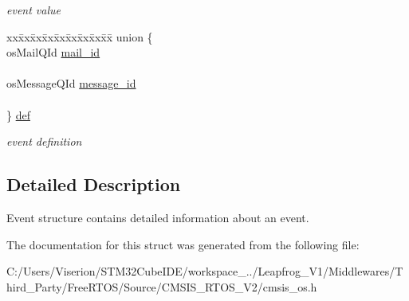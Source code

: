 \begin{DoxyCompactItemize}
\begin{tabbing}
\end{tabbing}\begin{DoxyCompactList}\small\item\em event value \end{DoxyCompactList}\item 
\mbox{\label{structos_event_a90f9650ceb8eb3a9481270a99caaa47f}} 
\begin{tabbing}
xx\=xx\=xx\=xx\=xx\=xx\=xx\=xx\=xx\=\kill
union \{\\
\>osMailQId \mbox{\hyperlink{structos_event_aeeccddfa51120e20a2316e73bdba099a}{mail\_id}}\\
\>\\
\>osMessageQId \mbox{\hyperlink{structos_event_af759bde42477c29f56ed1bf8a19c4db8}{message\_id}}\\
\>\\
\} \mbox{\hyperlink{structos_event_a90f9650ceb8eb3a9481270a99caaa47f}{def}}\\

\end{tabbing}\begin{DoxyCompactList}\small\item\em event definition \end{DoxyCompactList}\end{DoxyCompactItemize}


\subsection{Detailed Description}
Event structure contains detailed information about an event. 

The documentation for this struct was generated from the following file\+:\begin{DoxyCompactItemize}
\item 
C\+:/\+Users/\+Viserion/\+S\+T\+M32\+Cube\+I\+D\+E/workspace\+\_../\+Leapfrog\+\_\+\+V1/\+Middlewares/\+Third\+\_\+\+Party/\+Free\+R\+T\+O\+S/\+Source/\+C\+M\+S\+I\+S\+\_\+\+R\+T\+O\+S\+\_\+\+V2/cmsis\+\_\+os.\+h\end{DoxyCompactItemize}
